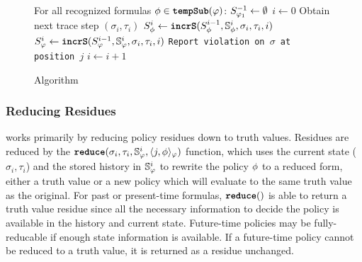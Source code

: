 \begin{figure}
\begin{algorithmic}[1]
\STATE For all recognized formulas $\policyv \in \tempSub(\policy)$: $\histst[\policy_1]{-1} \leftarrow \emptyset$
\STATE $i \leftarrow 0$
\LOOP
\STATE Obtain next trace step $(\sigma_i, \tau_i)$ 
	\STATE $\histst[\policyv]{i} \leftarrow \incrS(\histst[\policyv]{i-1}, \histSt[\policyv]{i}, \sigma_i, \tau_i, i)$
\ENDFOR
\STATE $\histst{i} \leftarrow \incrS(\histst{i-1}, \histSt{i}, \sigma_i, \tau_i, i)$
\STATE \texttt{Report violation on $\sigma$ at position $j$}
\ENDFOR
\STATE $i \leftarrow i + 1$
\ENDLOOP
\end{algorithmic}
\caption{\monitor Algorithm}\label{fig:algorithm}
\end{figure}

\subsubsection{Reducing Residues}
\monitor works primarily by reducing policy residues down to truth values. Residues are reduced by the $\reduce(\sigma_i, \tau_i, \histSt{i}, \rpt{j}{\policyv}{\policy})$ function, which uses the current state ($\sigma_i,\tau_i$) and the stored history in $\histSt{i}$ to rewrite the policy $\policyv$ to a reduced form, either a truth value or a new policy which will evaluate to the same truth value as the original. For past or present-time formulas, $\reduce()$ is able to return a truth value residue since all the necessary information to decide the policy is available in the history and current state. Future-time policies may be fully-reducable if enough state information is available. If a future-time policy cannot be reduced to a truth value, it is returned as a residue unchanged.

